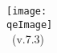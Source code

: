 \begin{center}
\def\version{7.3}
\def\qeImage{../../Doc/quantum_espresso}


  \texttt{[image: \\qeImage]} \\
  
	       \vspace{5.5cm}
  \Huge \intitle\ (v.\version) 
\end{center}
